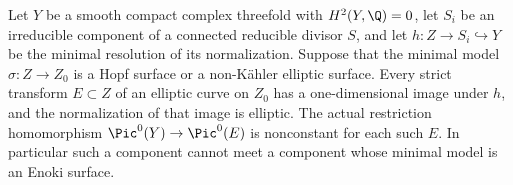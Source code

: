 
\begin{proposition}\label{cdp:st:C.2.INT.1}

Let $Y$ be a smooth compact complex threefold with
$H^2(Y,\Q)=0$, let $S_i$ be an irreducible component of
a connected reducible divisor $S$, and let
$h:Z\to S_i\hookrightarrow Y$ be the minimal resolution
of its normalization. Suppose that the minimal model
$\sigma:Z\to Z_0$ is a Hopf surface or a non-K\"ahler
elliptic surface. Every strict transform $E\subset Z$ of
an elliptic curve on $Z_0$ has a one-dimensional image
under $h$, and the normalization of that image is elliptic.
The actual restriction homomorphism
$\Pic^0(Y)\to\Pic^0(E)$ is nonconstant for each such $E$.
In particular such a component cannot meet a component
whose minimal model is an Enoki surface.
\end{proposition}
